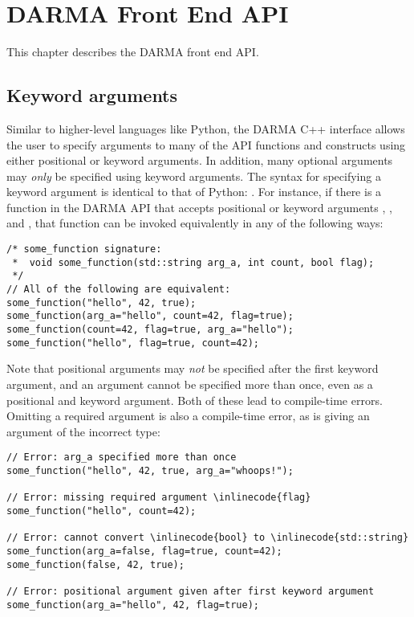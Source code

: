 \chapter{DARMA Front End API}
\label{chap:front_end}
This chapter describes the DARMA \gls{front end} \gls{API}. 

\section{Keyword arguments}
\label{sec:keyword}

Similar to higher-level languages like Python, the DARMA C++ interface allows the user
to specify arguments to many of the API functions and constructs using either positional
or keyword arguments.  In addition, many optional arguments may {\em only} be specified using
keyword arguments.  The syntax for specifying a keyword argument is identical to that
of Python: .  For instance, if there is a function  in the
DARMA API that accepts positional or keyword arguments , , and , that 
function can be invoked equivalently in any of the following ways:
\begin{lstlisting}
/* some_function signature:
 *  void some_function(std::string arg_a, int count, bool flag);
 */
// All of the following are equivalent:
some_function("hello", 42, true);
some_function(arg_a="hello", count=42, flag=true);
some_function(count=42, flag=true, arg_a="hello");
some_function("hello", flag=true, count=42);
\end{lstlisting}
Note that positional arguments may {\em not} be specified after the first keyword argument,
and an argument cannot be specified more than once, even as a positional and keyword
argument.  Both of these lead to compile-time errors. Omitting a required argument is 
also a compile-time error, as is giving an argument of the incorrect type: 
\begin{lstlisting}
// Error: arg_a specified more than once
some_function("hello", 42, true, arg_a="whoops!");

// Error: missing required argument \inlinecode{flag}
some_function("hello", count=42);

// Error: cannot convert \inlinecode{bool} to \inlinecode{std::string}
some_function(arg_a=false, flag=true, count=42);
some_function(false, 42, true);

// Error: positional argument given after first keyword argument
some_function(arg_a="hello", 42, flag=true);
\end{lstlisting}

